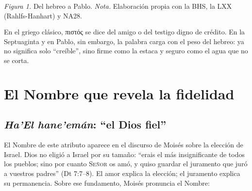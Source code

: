 \documentclass[11pt,letterpaper]{article}
\newcommand{\heb}[1]{\mbox{\foreignlanguage{hebrew}{#1}}}
\newcommand{\grc}[1]{\foreignlanguage{ancientgreek}{#1}}
\newcommand{\SENOR}{\textsc{Señor}}
\begin{document}
\begin{center}
\par
{\footnotesize\color{gris}\textit{Figura 1.} Del hebreo a Pablo. \textit{Nota.} Elaboración propia con la BHS, la LXX (Rahlfs-Hanhart) y NA28.}
\end{center}

En el griego clásico, \grc{πιστός} se dice del amigo o del testigo digno de crédito. En la Septuaginta y en Pablo, sin embargo, la palabra carga con el peso del hebreo: ya no significa solo ``creíble'', sino firme como la estaca y seguro como el agua que no se corta.

\section{El Nombre que revela la fidelidad}\label{sec:nombre-fiel}

\subsection{\emph{Ha'El hane'emán}: ``el Dios fiel''}
El Nombre de este atributo aparece en el discurso de Moisés sobre la elección de Israel. Dios no eligió a Israel por su tamaño: ``erais el más insignificante de todos los pueblos; sino por cuanto \SENOR{} os amó, y quiso guardar el juramento que juró a vuestros padres'' (Dt 7:7--8). El amor explica la elección; el juramento explica su permanencia. Sobre ese fundamento, Moisés pronuncia el Nombre:
\end{document}
